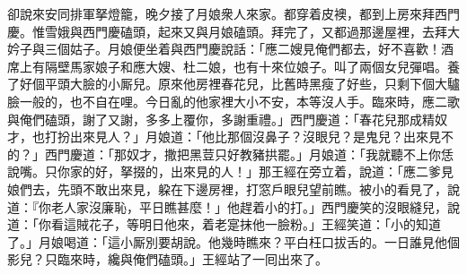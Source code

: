 卻說來安同排軍拏燈籠，晚夕接了月娘衆人來家。都穿着皮襖，都到上房來拜西門慶。惟雪娥與西門慶磕頭，起來又與月娘磕頭。拜完了，又都過那邊屋裡，去拜大妗子與三個姑子。月娘便坐着與西門慶說話：「應二嫂見俺們都去，好不喜歡！酒席上有隔壁馬家娘子和應大嫂、杜二娘，也有十來位娘子。叫了兩個女兒彈唱。養了好個平頭大臉的小厮兒。原來他房裡春花兒，比舊時黑瘦了好些，只剩下個大驢臉一般的，也不自在哩。今日亂的他家裡大小不安，本等沒人手。臨來時，應二歌與俺們磕頭，謝了又謝，多多上覆你，多謝重禮。」西門慶道：「春花兒那成精奴才，也打扮出來見人？」{}月娘道：「他比那個沒鼻子？沒眼兒？是鬼兒？出來見不的？」西門慶道：「那奴才，撒把黑荳只好教豬拱罷。」月娘道：「我就聽不上你恁說嘴。只你家的好，拏掇的，出來見的人！」那王經在旁立着，說道：「應二爹見娘們去，先頭不敢出來見，躱在下邊房裡，打窓戶眼兒望前瞧。被小的看見了，說道：『你老人家沒廉恥，平日瞧甚麼！」他趕着小的打。」西門慶笑的沒眼縫兒，{}說道：「你看這賊花子，等明日他來，着老寔抹他一臉粉。」王經笑道：「小的知道了。」月娘喝道：「這小厮別要胡說。他幾時瞧來？平白枉口拔舌的。一日誰見他個影兒？只臨來時，纔與俺們磕頭。」王經站了一囘出來了。

